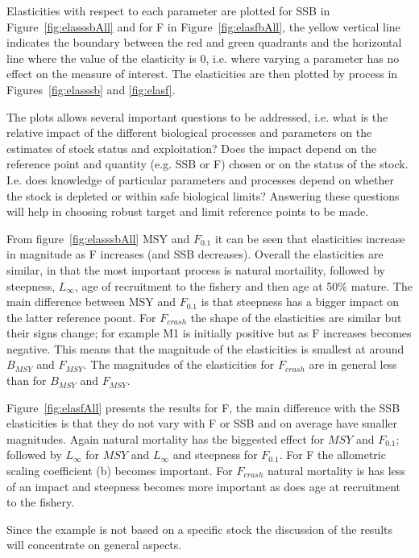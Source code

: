 \documentclass[10pt]{article}
\begin{document}
Elasticities with respect to each parameter are plotted for SSB in Figure~\ref{fig:elasssbAll} and for F in Figure~\ref{fig:elasfbAll}, the yellow vertical
line indicates the boundary between the red and green quadrants and the horizontal  line where the value of the elasticity is 0, i.e. where varying a parameter 
has no effect on the measure of interest. The elasticities are then plotted by process in Figures~\ref{fig:elasssb} and \ref{fig:elasf}. 

The plots allows several important questions to be addressed, i.e. what is the relative impact of the different biological processes and parameters 
on the estimates of stock status and exploitation? Does the impact depend on the reference point and quantity (e.g. SSB or F) chosen or on the status 
of the stock. I.e. does knowledge of particular parameters and processes depend on whether the stock is depleted or within safe biological limits? 
Answering these questions will help in choosing robust target and limit reference points to be made.

From figure~\ref{fig:elasssbAll} MSY and $F_{0.1}$ it can be seen that elasticities increase in magnitude as F increases (and SSB decreases). Overall the elasticities
are similar, in that the most important process is natural mortaility, followed by steepness, $L_{\infty}$, age of recruitment to the fishery and then age at 50\% mature. 
The main difference between MSY and $F_{0.1}$ is that steepness has a bigger impact on the latter reference poont. For $F_{crash}$ the shape of the elasticities
are similar but their signs change; for example M1 is initially positive but as F increases becomes negative. This means that the magnitude of the elasticities
is smallest at around $B_{MSY}$ and $F_{MSY}$. The magnitudes of the elasticities for $F_{crash}$ are in general less than for  $B_{MSY}$ and $F_{MSY}$. 

Figure~\ref{fig:elasfAll} presents the results for F, the main difference with the SSB elasticities is that they do not vary with F or SSB and on average have
smaller magnitudes. Again natural mortality has the biggested effect for $MSY$ and $F_{0.1}$; followed by $L_{\infty}$ for $MSY$ and  $L_{\infty}$ and steepness 
for $F_{0.1}$. For F the allometric scaling coefficient (b) becomes important. For $F_{crash}$ natural mortality is has less of an impact and steepness becomes 
more important as does age at recruitment to the fishery.   

Since the example is not based on a specific stock the discussion of the results will concentrate on general aspects.
\end{document}
